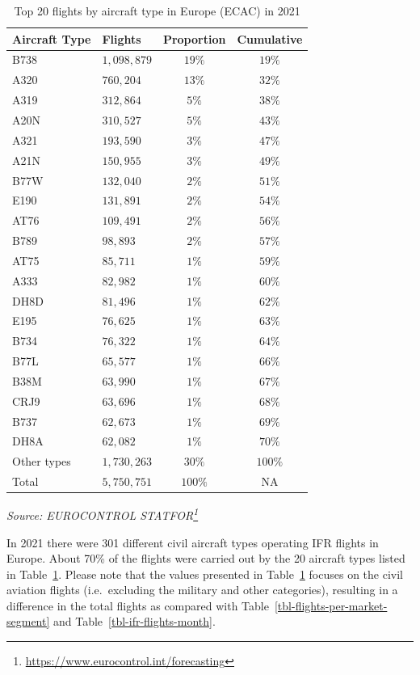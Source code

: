 \documentclass[
  11pt,
  a4paper,
]{book}
\DeclareRobustCommand{\href}[2]{#2\footnote{\url{#1}}}
\begin{document}
\hypertarget{tbl-flights-per-aircraft-type}{}
\setlength{\LTpost}{0mm}
\begin{longtable}{llcc}
\caption{\label{tbl-flights-per-aircraft-type}Top 20 flights by aircraft type in Europe (ECAC) in 2021 }\tabularnewline

\toprule
Aircraft Type & Flights & Proportion & Cumulative \\ 
\midrule
B738 & $1,098,879$ & $19\%$ & $19\%$ \\ 
A320 & $760,204$ & $13\%$ & $32\%$ \\ 
A319 & $312,864$ & $5\%$ & $38\%$ \\ 
A20N & $310,527$ & $5\%$ & $43\%$ \\ 
A321 & $193,590$ & $3\%$ & $47\%$ \\ 
A21N & $150,955$ & $3\%$ & $49\%$ \\ 
B77W & $132,040$ & $2\%$ & $51\%$ \\ 
E190 & $131,891$ & $2\%$ & $54\%$ \\ 
AT76 & $109,491$ & $2\%$ & $56\%$ \\ 
B789 & $98,893$ & $2\%$ & $57\%$ \\ 
AT75 & $85,711$ & $1\%$ & $59\%$ \\ 
A333 & $82,982$ & $1\%$ & $60\%$ \\ 
DH8D & $81,496$ & $1\%$ & $62\%$ \\ 
E195 & $76,625$ & $1\%$ & $63\%$ \\ 
B734 & $76,322$ & $1\%$ & $64\%$ \\ 
B77L & $65,577$ & $1\%$ & $66\%$ \\ 
B38M & $63,990$ & $1\%$ & $67\%$ \\ 
CRJ9 & $63,696$ & $1\%$ & $68\%$ \\ 
B737 & $62,673$ & $1\%$ & $69\%$ \\ 
DH8A & $62,082$ & $1\%$ & $70\%$ \\ 
Other types & $1,730,263$ & $30\%$ & $100\%$ \\ 
Total & $5,750,751$ & $100\%$ & NA \\ 
\bottomrule
\end{longtable}
\begin{minipage}{\linewidth}
\emph{Source: \href{https://www.eurocontrol.int/forecasting}{EUROCONTROL STATFOR}}\\
\end{minipage}

In 2021 there were 301 different civil aircraft types operating IFR
flights in Europe. About 70\% of the flights were carried out by the 20
aircraft types listed in Table~\ref{tbl-flights-per-aircraft-type}.
Please note that the values presented in
Table~\ref{tbl-flights-per-aircraft-type} focuses on the civil aviation
flights (i.e.~excluding the military and other categories), resulting in
a difference in the total flights as compared with
Table~\ref{tbl-flights-per-market-segment} and
Table~\ref{tbl-ifr-flights-month}.
\end{document}

